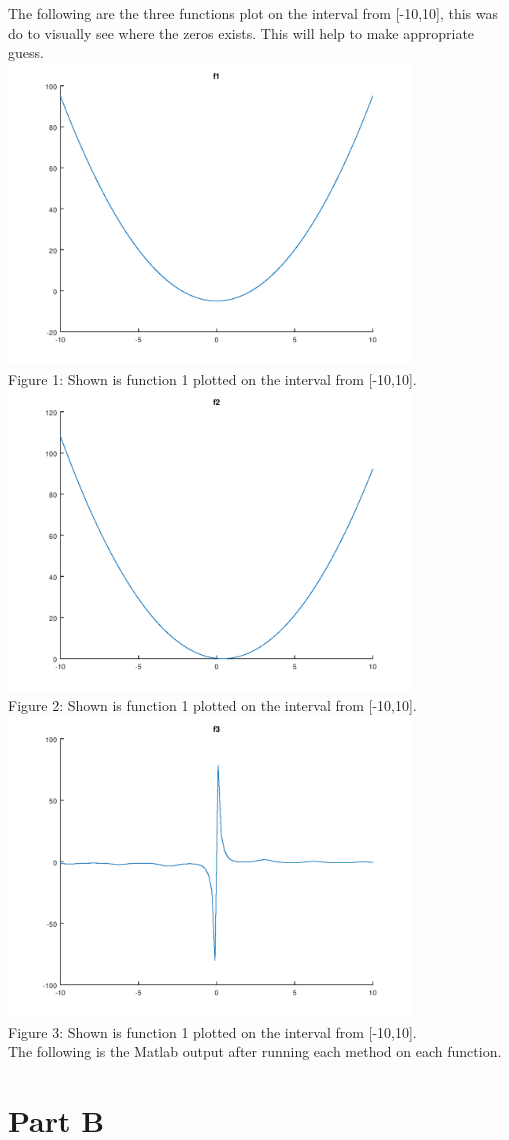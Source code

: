 \documentclass{article}
\begin{document}
The following are the three functions plot on the interval from [-10,10], this was do to visually see where the zeros exists. This will help to make appropriate guess.\\

\includegraphics[height=8cm]{f1.png}\\
Figure 1: Shown is function 1 plotted on the interval from [-10,10].\\
\includegraphics[height=8cm]{f2.png}\\
Figure 2: Shown is function 1 plotted on the interval from [-10,10].\\
\includegraphics[height=8cm]{f3.png}\\
Figure 3: Shown is function 1 plotted on the interval from [-10,10].\\

The following is the Matlab output after running each method on each function. 



\section*{Part B}
\end{document}

